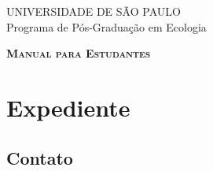 \documentclass{report}
\begin{document}

%
\begin{titlepage}


\begin{center}
{\LARGE  \sffamily UNIVERSIDADE DE SÃO PAULO \\[1em] 
Programa de Pós-Graduação em Ecologia}
\par
\vspace{0.2\paperheight}
{\Huge \scshape \bfseries Manual para Estudantes \\[2em] 
\the\year}
\par
\vfill
\end{center}
\end{titlepage}







\chapter{Expediente}

  


\vfill


\section{Contato}


\end{document}
